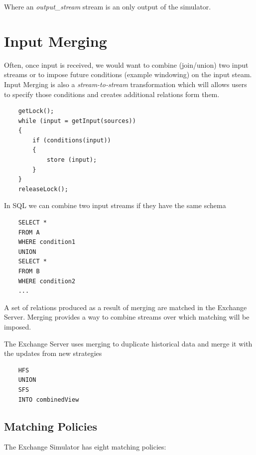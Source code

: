 \documentclass{article}
\begin{document}
\noindent Where an \emph{output\_stream} stream is an only output of the simulator. 


\section{Input Merging}

Often, once input is received, we would want to combine (join/union) two input streams or to impose future conditions (example windowing) on the input steam. Input Merging is also a \emph{stream-to-stream} transformation which will allows users to specify those conditions and creates additional relations form them.

\begin{verbatim}   
    getLock();
    while (input = getInput(sources))
    {
        if (conditions(input))
        {
            store (input);
        }
    }
    releaseLock();
\end{verbatim}


\noindent In SQL we can combine two input streams if they have the same schema 

\begin{verbatim}   
    SELECT *
    FROM A
    WHERE condition1
    UNION
    SELECT *
    FROM B
    WHERE condition2
    ...
\end{verbatim}


A set of relations produced as a result of merging are matched in the Exchange Server. Merging provides a way to combine streams over which matching will be imposed. 

The Exchange Server uses merging to duplicate historical data and merge it with the updates from new strategies

\begin{verbatim}  
    HFS
    UNION
    SFS
    INTO combinedView
\end{verbatim}

\subsection{Matching Policies}


The Exchange Simulator has eight matching policies:
\end{document}

